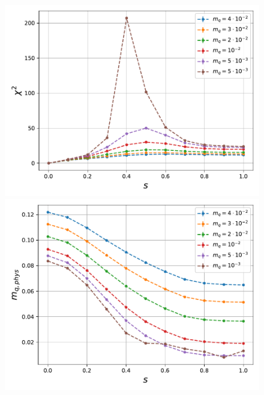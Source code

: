 \begin{figure}[h]
\begin{minipage}{0.45\textwidth}
\end{minipage}
\begin{minipage}{0.45\textwidth}	
	\includegraphics[scale=0.48]{figures/chiral_PT/susceptibility.pdf}
\end{minipage}
\hfill
\begin{minipage}{0.45\textwidth}	
	\includegraphics[scale=0.48]{figures/chiral_PT/mqphys.pdf}
\end{minipage}
\hfill
\begin{minipage}{0.45\textwidth}

\end{minipage}
\end{figure}
